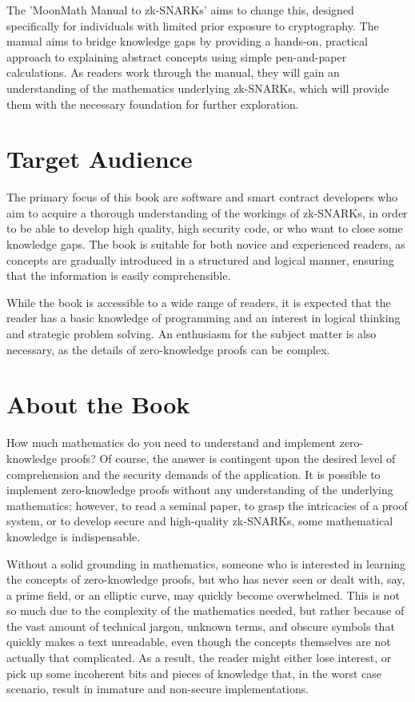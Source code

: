 The 'MoonMath Manual to zk-SNARKs' aims to change this, designed specifically for individuals with limited prior exposure to cryptography. The manual aims to bridge knowledge gaps by providing a hands-on, practical approach to explaining abstract concepts using simple pen-and-paper calculations. As readers work through the manual, they will gain an understanding of the mathematics underlying zk-SNARKs, which will provide them with the necessary foundation for further exploration.

\section{Target Audience}
The primary focus of this book are software and smart contract developers who aim to acquire a thorough understanding of the workings of zk-SNARKs, in order to be able to develop high quality, high security code, or who want to close some knowledge gaps. The book is suitable for both novice and experienced readers, as concepts are gradually introduced in a structured and logical manner, ensuring that the information is easily comprehensible.

While the book is accessible to a wide range of readers, it is expected that the reader has a basic knowledge of programming and an interest in logical thinking and strategic problem solving. An enthusiasm for the subject matter is also necessary, as the details of zero-knowledge proofs can be complex. 


\section{About the Book}
How much mathematics do you need to understand and implement zero-knowledge proofs? Of course, the answer is contingent upon the desired level of comprehension and the security demands of the application. It is possible to implement zero-knowledge proofs without any understanding of the underlying mathematics; however, to read a seminal paper, to grasp the intricacies of a proof system, or to develop secure and high-quality zk-SNARKs, some mathematical knowledge is indispensable.

Without a solid grounding in mathematics, someone who is interested in learning the concepts of zero-knowledge proofs, but who has never seen or dealt with, say, a prime field, or an elliptic curve, may quickly become overwhelmed. This is not so much due to the complexity of the mathematics needed, but rather because of the vast amount of technical jargon, unknown terms, and obscure symbols that quickly makes a text unreadable, even though the concepts themselves are not actually that complicated. As a result, the reader might either lose interest, or pick up some incoherent bits and pieces of knowledge that, in the worst case scenario, result in immature and non-secure implementations. 

